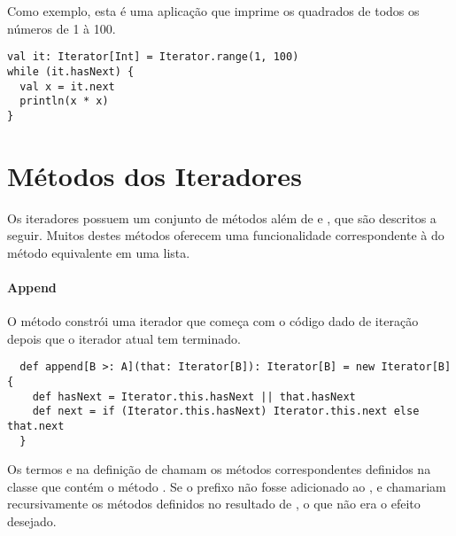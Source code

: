 Como exemplo, esta é uma aplicação que imprime os quadrados de todos os números de 1 à 100.
\begin{lstlisting}
val it: Iterator[Int] = Iterator.range(1, 100)
while (it.hasNext) {
  val x = it.next
  println(x * x)
}
\end{lstlisting}

\section{Métodos dos Iteradores}

Os iteradores possuem um conjunto de métodos além de  e
, que são descritos a seguir. Muitos destes métodos
oferecem uma funcionalidade correspondente à do método equivalente em uma lista.

\paragraph{Append}
O método  constrói uma iterador que começa com o código dado de iteração ~~ depois 
que o iterador atual tem terminado.
\begin{lstlisting}
  def append[B >: A](that: Iterator[B]): Iterator[B] = new Iterator[B] {
    def hasNext = Iterator.this.hasNext || that.hasNext
    def next = if (Iterator.this.hasNext) Iterator.this.next else that.next
  }    
\end{lstlisting}
Os termos  e 
na definição de  chamam os métodos correspondentes definidos na classe  
que contém o método . Se o prefixo
 não fosse adicionado ao ,
 e  chamariam recursivamente os métodos definidos no resultado de ,
o que não era o efeito desejado.

